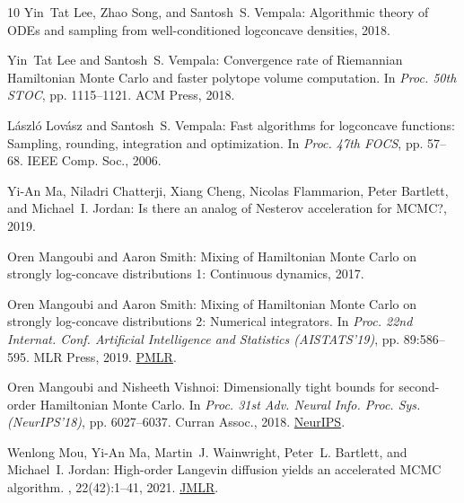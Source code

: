 \begin{thebibliography}{10}
{\sc Yin~Tat Lee, Zhao Song, and Santosh~S. Vempala}: Algorithmic theory of
  {ODE}s and sampling from well-conditioned logconcave densities, 2018.

{\sc Yin~Tat Lee and Santosh~S. Vempala}: Convergence rate of {R}iemannian
  {H}amiltonian {M}onte {C}arlo and faster polytope volume computation.
\newblock In {\em Proc. 50th STOC}, pp. 1115--1121. ACM Press, 2018.

{\sc L{\'a}szl{\'o} Lov{\'a}sz and Santosh~S. Vempala}: Fast algorithms for
  logconcave functions: {S}ampling, rounding, integration and optimization.
\newblock In {\em Proc. 47th FOCS}, pp. 57--68. IEEE Comp. Soc., 2006.

{\sc Yi-An Ma, Niladri Chatterji, Xiang Cheng, Nicolas Flammarion, Peter
  Bartlett, and Michael~I. Jordan}: Is there an analog of {N}esterov
  acceleration for {MCMC}?, 2019.

{\sc Oren Mangoubi and Aaron Smith}: Mixing of {H}amiltonian {M}onte {C}arlo on
  strongly log-concave distributions 1: Continuous dynamics, 2017.

{\sc Oren Mangoubi and Aaron Smith}: Mixing of {H}amiltonian {M}onte {C}arlo on
  strongly log-concave distributions 2: {N}umerical integrators.
\newblock In {\em Proc. 22nd Internat. Conf. Artificial Intelligence and
  Statistics (AISTATS'19)}, pp. 89:586--595. MLR Press, 2019.
\newblock \href{https://proceedings.mlr.press/v89/mangoubi19a.html}{PMLR}.

{\sc Oren Mangoubi and Nisheeth Vishnoi}: Dimensionally tight bounds for
  second-order {H}amiltonian {M}onte {C}arlo.
\newblock In {\em Proc. 31st Adv. Neural Info. Proc. Sys. (NeurIPS'18)}, pp.
  6027--6037. Curran Assoc., 2018.
\newblock
  \href{https://papers.nips.cc/paper/2018/hash/e07bceab69529b0f0b43625953fbf2a0-Abstract.html}{NeurIPS}.

{\sc Wenlong Mou, Yi-An Ma, Martin~J. Wainwright, Peter~L. Bartlett, and
  Michael~I. Jordan}: High-order {L}angevin diffusion yields an accelerated
  {MCMC} algorithm.
, 22(42):1--41, 2021.
\newblock \href{https://jmlr.org/papers/v22/20-576.html}{JMLR}.


\end{thebibliography}
